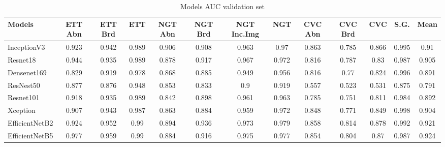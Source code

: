 \documentclass[journal, a4paper]{IEEEtran}
\begin{document}
\begin{table}[ht]
	\bigskip
	\begin{minipage}{\linewidth}
		\centering
		\begin{tabular}{||l c c c c c c c c c c c c||}
			\hline
			Models         & ETT Abn & ETT Brd & ETT   & NGT Abn & NGT Brd & NGT Inc.Img & NGT   & CVC Abn & CVC Brd & CVC   & S.G.  & Mean  \\ [0.5ex] \hline\hline
			InceptionV3    & 0.923   & 0.942   & 0.989 & 0.906   & 0.908   & 0.963       & 0.97  & 0.863   & 0.785   & 0.866 & 0.995 & 0.91  \\ \hline
			Resnet18       & 0.944   & 0.935   & 0.989 & 0.878   & 0.917   & 0.967       & 0.972 & 0.816   & 0.787   & 0.83  & 0.987 & 0.905 \\ \hline
			Densenet169    & 0.829   & 0.919   & 0.978 & 0.868   & 0.885   & 0.949       & 0.956 & 0.816   & 0.77    & 0.824 & 0.996 & 0.891 \\ \hline
			ResNest50      & 0.877   & 0.876   & 0.948 & 0.853   & 0.833   & 0.9         & 0.919 & 0.557   & 0.523   & 0.531 & 0.875 & 0.791 \\ \hline
			Resnet101      & 0.918   & 0.935   & 0.989 & 0.842   & 0.898   & 0.961       & 0.963 & 0.785   & 0.751   & 0.811 & 0.984 & 0.892 \\ \hline
			Xception       & 0.907   & 0.943   & 0.987 & 0.863   & 0.884   & 0.959       & 0.972 & 0.848   & 0.771   & 0.849 & 0.998 & 0.904 \\ \hline
			EfficientNetB2 & 0.924   & 0.952   & 0.99  & 0.894   & 0.936   & 0.973       & 0.979 & 0.858   & 0.814   & 0.878 & 0.992 & 0.921 \\ \hline
			EfficientNetB5 & 0.977   & 0.959   & 0.99  & 0.884   & 0.916   & 0.975       & 0.977 & 0.854   & 0.804   & 0.87  & 0.987 & 0.924 \\ [0.5ex] \hline
		\end{tabular}
		\label{tab:models_auc}
		\caption{Models AUC validation set}
	\end{minipage}
			  

\end{table}
\end{document}
